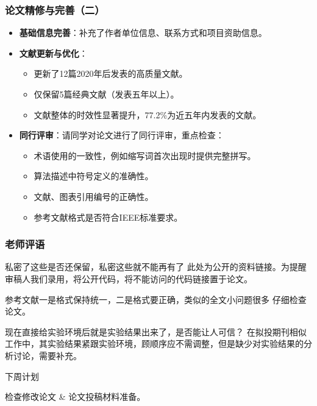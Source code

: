 \documentclass{beamer}
\begin{document}
\begin{frame}
    \frametitle{论文精修与完善（二）}
    \setcounter{enumi}{3}
    \begin{itemize}
        \item \textbf{基础信息完善}：补充了作者单位信息、联系方式和项目资助信息。

        \item \textbf{文献更新与优化}：
        \begin{itemize}
            \item 更新了12篇2020年后发表的高质量文献。
            \item 仅保留5篇经典文献（发表五年以上）。
            \item 文献整体的时效性显著提升，77.2\%为近五年内发表的文献。
        \end{itemize}

        \item \textbf{同行评审}：请同学对论文进行了同行评审，重点检查：
        \begin{itemize}
            \item 术语使用的一致性，例如缩写词首次出现时提供完整拼写。
            \item 算法描述中符号定义的准确性。
            \item 文献、图表引用编号的正确性。
            \item 参考文献格式是否符合IEEE标准要求。
        \end{itemize}
    \end{itemize}
\end{frame}

\begin{frame}
    \frametitle{老师评语}
    \begin{alertblock}{私密了这些是否还保留，私密这些就不能再有了}
        此处为公开的资料链接。为提醒审稿人我们录用，将公开代码，将不能访问的代码链接置于论文。
    \end{alertblock}

    \begin{alertblock}{参考文献一是格式保持统一，二是格式要正确，类似的全文小问题很多}
      仔细检查论文。
    \end{alertblock}

    \begin{alertblock}{现在直接给实验环境后就是实验结果出来了，是否能让人可信？}
     在拟投期刊相似工作中，其实验结果紧跟实验环境，顾顺序应不需调整，但是缺少对实验结果的分析讨论，需要补充。
    \end{alertblock}

    \begin{block}{下周计划}

  检查修改论文 \& 论文投稿材料准备。

  \end{block}
\end{frame}
\end{document}
